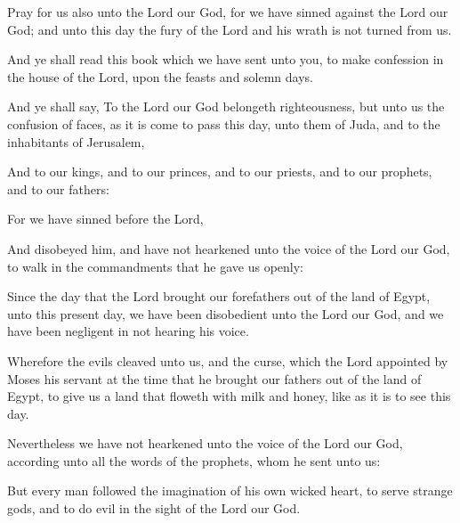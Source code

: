 {\par }{\PP {}Pray for us also unto the Lord our God, for we have sinned against the Lord our God; and unto this day the fury of the Lord and his wrath is not turned from us.
\par }{\PP {}And ye shall read this book which we have sent unto you, to make confession in the house of the Lord, upon the feasts and solemn days.
\par }{\PP {}And ye shall say, To the Lord our God belongeth righteousness, but unto us the confusion of faces, as it is come to pass this day, unto them of Juda, and to the inhabitants of Jerusalem,
\par }{\PP {}And to our kings, and to our princes, and to our priests, and to our prophets, and to our fathers:
\par }{\PP {}For we have sinned before the Lord,
\par }{\PP {}And disobeyed him, and have not hearkened unto the voice of the Lord our God, to walk in the commandments that he gave us openly:
\par }{\PP {}Since the day that the Lord brought our forefathers out of the land of Egypt, unto this present day, we have been disobedient unto the Lord our God, and we have been negligent in not hearing his voice.
\par }{\PP {}Wherefore the evils cleaved unto us, and the curse, which the Lord appointed by Moses his servant at the time that he brought our fathers out of the land of Egypt, to give us a land that floweth with milk and honey, like as it is to see this day.
\par }{\PP {}Nevertheless we have not hearkened unto the voice of the Lord our God, according unto all the words of the prophets, whom he sent unto us:
\par }{\PP {}But every man followed the imagination of his own wicked heart, to serve strange gods, and to do evil in the sight of the Lord our God.

}
